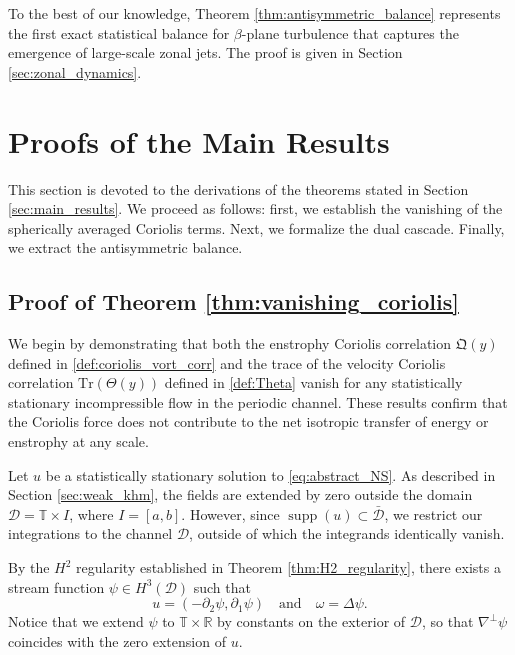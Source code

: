 \documentclass[11pt,a4paper]{article}
\numberwithin{equation}{section}
\numberwithin{theorem}{section}
\numberwithin{remark}{section}
\numberwithin{definition}{section}
\begin{document}
To the best of our knowledge, Theorem \ref{thm:antisymmetric_balance} represents the first exact statistical balance for $\beta$-plane turbulence that captures the emergence of large-scale zonal jets. The proof is given in Section \ref{sec:zonal_dynamics}.



\section{Proofs of the Main Results}\label{sec:proofs}

This section is devoted to the derivations of the theorems stated in Section \ref{sec:main_results}. We proceed as follows: first, we establish the vanishing of the spherically averaged Coriolis terms. Next, we formalize the dual cascade. Finally, we extract the antisymmetric balance.

\subsection{Proof of Theorem \ref{thm:vanishing_coriolis}}\label{sec:vanishing}
We begin by demonstrating that both the enstrophy Coriolis correlation $\mathfrak{Q}(y)$ defined in \eqref{def:coriolis_vort_corr} and the trace of the velocity Coriolis correlation $\text{Tr}(\varTheta(y))$ defined in \eqref{def:Theta} vanish for any statistically stationary incompressible flow in the periodic channel. These results confirm that the Coriolis force does not contribute to the net isotropic transfer of energy or enstrophy at any scale.

Let $u$ be a statistically stationary solution to \eqref{eq:abstract_NS}. As described in Section \ref{sec:weak_khm}, the fields are extended by zero outside the domain $\mathcal{D} = \mathbb{T} \times I$, where $I = [a, b]$. However, since $\operatorname{supp}(u) \subset \bar{\mathcal{D}}$, we restrict our integrations to the channel $\mathcal{D}$, outside of which the integrands identically vanish.

By the $H^2$ regularity established in Theorem \ref{thm:H2_regularity}, there exists a stream function $\psi \in H^3(\mathcal{D})$ such that
\begin{equation}\label{eq:stream_function}
    u = (-\partial_2 \psi, \partial_1 \psi) \quad \text{and} \quad \omega = \Delta \psi.
\end{equation}
Notice that we extend $\psi$ to $\mathbb T\times\mathbb R$ by constants on the exterior of $\mathcal{D}$, so that $\nabla^\perp\psi$ coincides with the zero extension of $u$.
\end{document}
